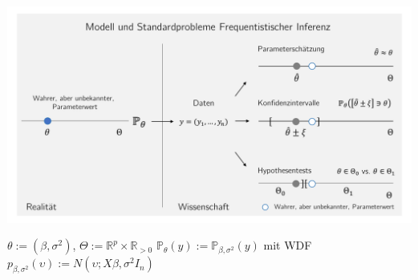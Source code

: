 \documentclass[
  8pt,
  ignorenonframetext,
]{beamer}
\begin{document}
\begin{frame}{}
\protect\hypertarget{section-5}{}
\center

\begin{center}\includegraphics[width=1\linewidth]{7_Abbildungen/alm_7_frequentistische_inferenz} \end{center}
\center
\footnotesize

\(\theta := (\beta,\sigma^2)\),
\(\Theta := \mathbb{R}^p \times \mathbb{R}_{>0}\)
\(\mathbb{P}_\theta(y) := \mathbb{P}_{\beta,\sigma^2}(y)\) mit WDF
\(p_{\beta,\sigma^2}(\upsilon) := N(\upsilon;X\beta,\sigma^2I_n)\)
\end{frame}
\end{document}
